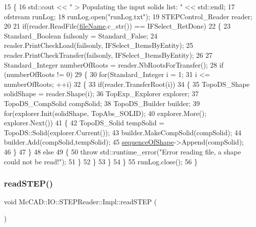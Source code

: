 \begin{DoxyCode}
15                                \{
16     std::cout << \textcolor{stringliteral}{" > Populating the input solids list: "} << std::endl;
17     ofstream runLog;
18     runLog.open(\textcolor{stringliteral}{"runLog.txt"});
19     STEPControl\_Reader reader;
20 
21     \textcolor{keywordflow}{if}(reader.ReadFile(\hyperlink{classMcCAD_1_1IO_1_1STEPReader_1_1Impl_ad06c3157407f90e8a4b4524da0c9ceba}{fileName}.c\_str()) == IFSelect\_RetDone)
22       \{
23     Standard\_Boolean failsonly = Standard\_False;
24     reader.PrintCheckLoad(failsonly, IFSelect\_ItemsByEntity);
25     reader.PrintCheckTransfer(failsonly, IFSelect\_ItemsByEntity);
26     
27     Standard\_Integer numberOfRoots = reader.NbRootsForTransfer();
28     \textcolor{keywordflow}{if} (numberOfRoots != 0)
29       \{
30         \textcolor{keywordflow}{for}(Standard\_Integer i = 1;
31         i <= numberOfRoots; ++i)
32           \{
33         \textcolor{keywordflow}{if}(reader.TransferRoot(i))
34           \{
35             TopoDS\_Shape  solidShape = reader.Shape(i);
36             TopExp\_Explorer explorer;
37             TopoDS\_CompSolid compSolid;
38                     TopoDS\_Builder builder;
39             \textcolor{keywordflow}{for}(explorer.Init(solidShape, TopAbs\_SOLID);
40             explorer.More(); explorer.Next())
41               \{
42             TopoDS\_Solid tempSolid = TopoDS::Solid(explorer.Current());
43             builder.MakeCompSolid(compSolid);
44                         builder.Add(compSolid,tempSolid);
45                         \hyperlink{classMcCAD_1_1IO_1_1STEPReader_1_1Impl_a420bbc46a0f7740eca71ef5aa6ce5e55}{sequenceOfShape}->Append(compSolid);
46               \}
47           \}
48         \textcolor{keywordflow}{else}
49           \{
50             \textcolor{keywordflow}{throw} std::runtime\_error(\textcolor{stringliteral}{"Error reading file, a shape could not be read!"});
51           \}
52           \}
53       \}
54       \}
55     runLog.close();
56 \}
\end{DoxyCode}
\mbox{\label{classMcCAD_1_1IO_1_1STEPReader_1_1Impl_adf3fe2fde0c4b949317c2e07b2fa57b9}} 
\subsubsection{\texorpdfstring{read\+S\+T\+E\+P()}{readSTEP()}\hspace{0.1cm}{\footnotesize\ttfamily [2/2]}}
{\footnotesize\ttfamily void Mc\+C\+A\+D\+::\+I\+O\+::\+S\+T\+E\+P\+Reader\+::\+Impl\+::read\+S\+T\+EP (\begin{DoxyParamCaption}{ }\end{DoxyParamCaption})}



